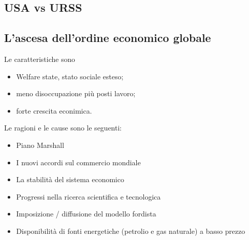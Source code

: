 \documentclass[a4paper]{article}
\begin{document}
\subsection{USA vs URSS}

\begin{center}
\end{center}


\subsection{L'ascesa dell'ordine economico globale}


Le caratteristiche sono
\begin{itemize}
    \item Welfare state, stato sociale esteso;
    \item meno disoccupazione più posti lavoro;
    \item forte crescita econimica.
\end{itemize}


Le ragioni e le cause sono le seguenti:
\begin{itemize}
    \item Piano Marshall
    \item I nuovi accordi sul commercio mondiale
    \item La stabilità del sistema economico
    \item Progressi nella ricerca scientifica e tecnologica
    \item Imposizione / diffusione del modello fordista
    \item Disponibilità di fonti energetiche (petrolio e gas naturale) a basso prezzo
\end{itemize}
\end{document}

